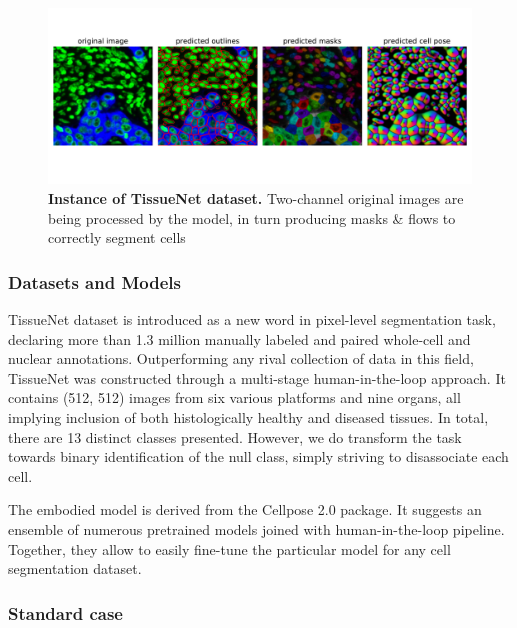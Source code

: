 \documentclass{article}
\begin{document}
\begin{figure}
	\advance\leftskip-0.5cm
	\includegraphics[width=8in]{img/tissuenet.pdf}
	\caption{{\bf Instance of TissueNet dataset.} Two-channel original images are being processed by the model, in turn producing masks \& flows to correctly segment cells}
	\label{fig:tissue_example}
\end{figure} 

\subsubsection{Datasets and Models}

TissueNet dataset is introduced as a new word in pixel-level segmentation task, declaring more than 1.3 million manually labeled and paired whole-cell and nuclear annotations. Outperforming any rival collection of data in this field, TissueNet was constructed through a multi-stage human-in-the-loop approach. It contains (512, 512) images from six various platforms and nine organs, all implying inclusion of both histologically healthy and diseased tissues. In total, there are 13 distinct classes presented. However, we do transform the task towards binary identification of the null class, simply striving to disassociate each cell.   

The embodied model is derived from the Cellpose 2.0 package. It suggests an ensemble of numerous  pretrained models joined with human-in-the-loop pipeline. Together, they allow to easily fine-tune the particular model for any cell segmentation dataset.

\subsubsection{Standard case}
\end{document}
